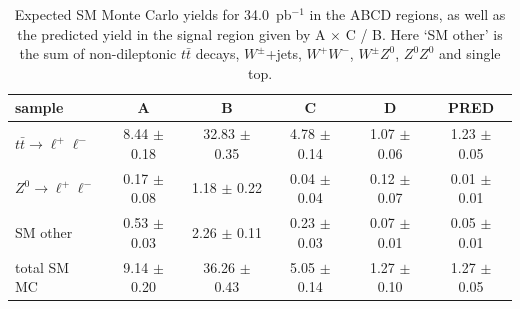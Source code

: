 \begin{table}[ht]
\begin{center}
\caption{\label{tab:abcdMC} Expected SM Monte Carlo yields for 
34.0~pb$^{-1}$ in the ABCD regions, as well as the predicted yield in
the signal region given by A $\times$ C / B. Here `SM other' is the sum
of non-dileptonic $t\bar{t}$ decays, $W^{\pm}$+jets, $W^+W^-$, 
$W^{\pm}Z^0$, $Z^0Z^0$ and single top.}
\begin{tabular}{lccccc}
\hline
              sample                     &                   A   &                   B   &                   C   &                   D   &                PRED  \\
\hline
$t\bar{t}\rightarrow \ell^{+}\ell^{-}$   &   8.44  $\pm$  0.18   &  32.83  $\pm$  0.35   &   4.78  $\pm$  0.14   &   1.07  $\pm$  0.06   &   1.23  $\pm$  0.05  \\
$Z^0 \rightarrow \ell^{+}\ell^{-}$       &   0.17  $\pm$  0.08   &   1.18  $\pm$  0.22   &   0.04  $\pm$  0.04   &   0.12  $\pm$  0.07   &   0.01  $\pm$  0.01  \\
            SM other                     &   0.53  $\pm$  0.03   &   2.26  $\pm$  0.11   &   0.23  $\pm$  0.03   &   0.07  $\pm$  0.01   &   0.05  $\pm$  0.01  \\
\hline
         total SM MC                     &   9.14  $\pm$  0.20   &  36.26  $\pm$  0.43   &   5.05  $\pm$  0.14   &   1.27  $\pm$  0.10   &   1.27  $\pm$  0.05  \\
\hline
\end{tabular}
\end{center}
\end{table}



